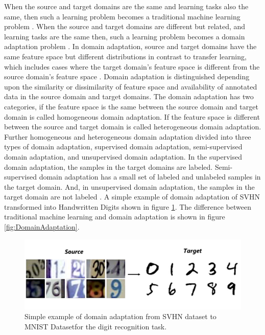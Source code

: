 When the source and target domains are the same and learning tasks also the same, then such a learning problem becomes a traditional machine learning problem \cite{5288526}. When the source and target domains are different but related, and learning tasks are the same then, such a learning problem becomes a domain adaptation problem \cite{5288526}. In domain adaptation, source and target domains have the same feature space but different distributions in contrast to transfer learning, which includes cases where the target domain's feature space is different from the source domain's feature space \cite{5288526}. Domain adaptation is distinguished depending upon the similarity or dissimilarity of feature space and availability of annotated data in the source domain and target domains. The domain adaptation has two categories, if the feature space is the same between the source domain and target domain is called homogeneous domain adaptation. If the feature space is different between the source and target domain is called heterogeneous domain adaptation. Further homogeneous and heterogeneous domain adaptation divided into three types of domain adaptation, supervised domain adaptation, semi-supervised domain adaptation, and unsupervised domain adaptation. In the supervised domain adaptation, the samples in the target domains are labeled. Semi-supervised domain adaptation has a small set of labeled and unlabeled samples in the target domain. And, in unsupervised domain adaptation, the samples in the target domain are not labeled \cite{5288526}. A simple example of domain adaptation of  \ac{SVHN} transformed into Handwritten Digits shown in figure \ref{fig:DA}. The difference between traditional machine learning and domain adaptation is shown in figure \ref{fig:DomainAdaptation}.


\begin{figure}[H]
        \begin{center}
 	    \includegraphics[scale=0.15]{images/Introduction/DA.png}
	    \caption[Simple example of domain adaptation from \ac{SVHN} dataset to \ac{MNIST} Dataset for the digit recognition task.]{Simple example of domain adaptation from \ac{SVHN} dataset \cite{37648} to \ac{MNIST} Dataset\footnotemark for the digit recognition task.\footnotemark}
	    \label{fig:DA}
	    \end{center}
\end{figure}





